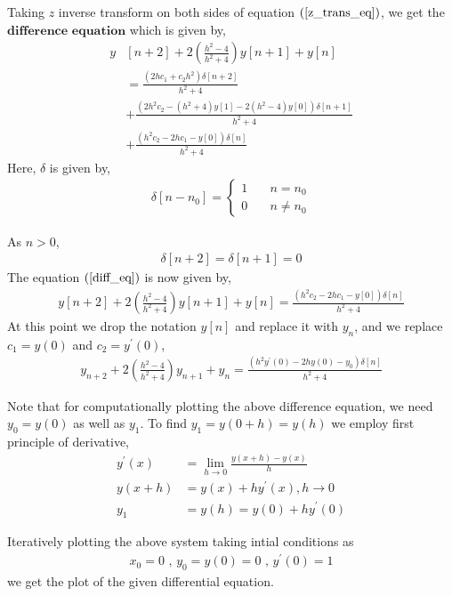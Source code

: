 \documentclass{beamer}
\providecommand{\sbrak}[1]{\ensuremath{{}\left[#1\right]}}
\providecommand{\brak}[1]{\ensuremath{\left(#1\right)}}
\theoremstyle{remark}
\numberwithin{equation}{section}
\begin{document}
\begin{frame}
Taking $z$ inverse transform on both sides of equation $\brak{\ref{z_trans_eq}}$, we get the $\textbf{difference equation}$ which is given by,
\begin{align}
    y&\sbrak{n + 2} + 2\brak{\frac{h^2 - 4}{h^2 + 4}} y\sbrak{n + 1} + y\sbrak{n} \nonumber\\
    &= \frac{\brak{2h c_1 + c_2 h^2}\delta\sbrak{n + 2}}{h^2 + 4} \nonumber\\
    &+ \frac{\brak{2h^2 c_2 - \brak{h^2 + 4}y\sbrak{1} - 2\brak{h^2 - 4}y\sbrak{0}}\delta\sbrak{n + 1}}{h^2 + 4} \nonumber\\
    &+ \frac{\brak{h^2c_2 - 2hc_1 - y\sbrak{0}}\delta\sbrak{n}}{h^2 + 4} \label{diff_eq}
\end{align}
Here, $\delta$ is given by,
\begin{align}
    \delta\sbrak{n - n_0} =
    \begin{cases}
        1 & \quad n = n_0\\
        0 & \quad n \neq n_0
    \end{cases}
\end{align}
\end{frame}

\begin{frame}
As $n > 0$, 
\begin{align}
    \delta\sbrak{n + 2} = \delta\sbrak{n + 1} = 0
\end{align}
The equation \brak{\ref{diff_eq}} is now given by,
\begin{align}
    y\sbrak{n + 2} + 2\brak{\frac{h^2 - 4}{h^2 + 4}} y\sbrak{n + 1} + y\sbrak{n} = \frac{\brak{h^2c_2 - 2hc_1 - y\sbrak{0}}\delta\sbrak{n}}{h^2 + 4} 
\end{align}
At this point we drop the notation $y\sbrak{n}$ and replace it with $y_n$, and we replace $c_1 = y\brak{0}$ and $c_2 = y^{\prime}\brak{0}$,
\begin{align}
    y_{n + 2} + 2\brak{\frac{h^2 - 4}{h^2 + 4}} y_{n + 1} + y_{n} = \frac{\brak{h^2y^{\prime}\brak{0} - 2hy\brak{0} - y_0}\delta\sbrak{n}}{h^2 + 4} 
\end{align}
\end{frame}

\begin{frame}
Note that for computationally plotting the above difference equation, we need $y_0 = y\brak{0}$ as well as $y_1$. To find $y_1 = y\brak{0 + h} = y\brak{h}$ we employ first principle of derivative,
\begin{align}
    y^{\prime}\brak{x} &= \lim_{h\to0} \frac{y\brak{x + h} - y\brak{x}}{h}\\
    y\brak{x + h} &= y\brak{x} + hy^{\prime}\brak{x}, h\to0\\
    y_1 &= y\brak{h} = y\brak{0} + hy^{\prime}\brak{0}
\end{align}

Iteratively plotting the above system taking intial conditions as 
\begin{align}
    x_0 = 0 \text{ , } y_{0} = y\brak{0} = 0 \text{ , } y^{\prime}\brak{0} = 1
\end{align}
we get the plot of the given differential equation.
\end{frame}
\end{document}
